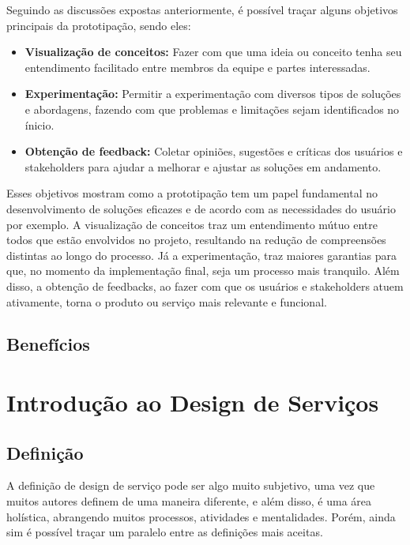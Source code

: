 Seguindo as discussões expostas anteriormente, é possível traçar alguns objetivos principais da prototipação, sendo eles:

\begin{itemize}
	\item \textbf{Visualização de conceitos:} Fazer com que uma ideia ou conceito tenha seu entendimento facilitado entre membros da equipe e partes interessadas.
	
	\item \textbf{Experimentação:} Permitir a experimentação com diversos tipos de soluções e abordagens, fazendo com que problemas e limitações sejam identificados no ínicio.
	
	\item \textbf{Obtenção de feedback:} Coletar opiniões, sugestões e críticas dos usuários e stakeholders para ajudar a melhorar e ajustar as soluções em andamento.
\end{itemize}

Esses objetivos mostram como a prototipação tem um papel fundamental no desenvolvimento de soluções eficazes e de acordo com as necessidades do usuário por exemplo. A visualização de conceitos traz um entendimento mútuo entre todos que estão envolvidos no projeto, resultando na redução de compreensões distintas ao longo do processo. Já a experimentação, traz maiores garantias para que, no momento da implementação final, seja um processo mais tranquilo. Além disso, a obtenção de feedbacks, ao fazer com que os usuários e stakeholders atuem ativamente, torna o produto ou serviço mais relevante e funcional.

\subsection{Benefícios}

\section{Introdução ao Design de Serviços}

\subsection{Definição}

A definição de design de serviço pode ser algo muito subjetivo, uma vez que muitos autores definem de uma maneira diferente, e além disso, é uma área holística, abrangendo muitos processos, atividades e mentalidades. Porém, ainda sim é possível traçar um paralelo entre as definições mais aceitas.

